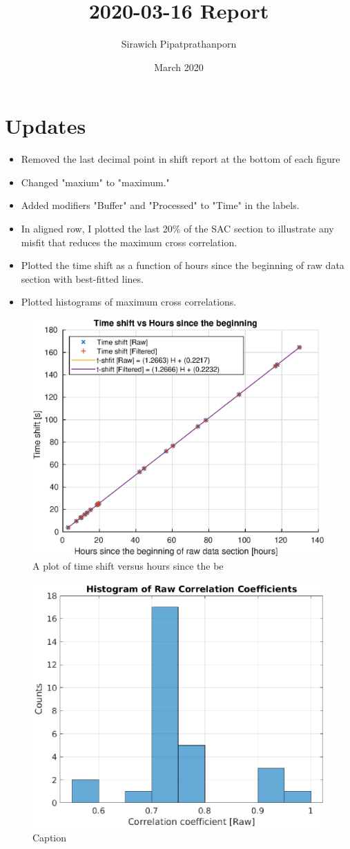 \documentclass[11pt,letterpaper]{article}
\title{2020-03-16 Report}
\author{Sirawich Pipatprathanporn}
\date{March 2020}
\begin{document}
\maketitle

\section{Updates}
\begin{itemize}
    \item Removed the last decimal point in shift report at the bottom of each figure
    \item Changed "maxium" to "maximum."
    \item Added modifiers "Buffer" and "Processed" to "Time" in the labels.
    \item In aligned row, I plotted the last 20\% of the SAC section to illustrate any misfit that reduces the maximum cross correlation.
    \item Plotted the time shift as a function of hours since the beginning of raw data section with best-fitted lines.
    \item Plotted histograms of maximum cross correlations.
\end{itemize}

\begin{figure}
    \centering
    \includegraphics[width=0.7\linewidth]{Figures/Plots/timeshift_vs_hours_since_beginning.eps}
    \caption{A plot of time shift versus hours since the be}
    \label{fig:timeshift_vs_hours}
\end{figure}

\begin{figure}
    \centering
    \includegraphics[width=0.5\linewidth]{Figures/Plots/raw_cc_histogram.eps}
    \caption{Caption}
    \label{fig:raw_cc_histogram}
\end{figure}
\end{document}
